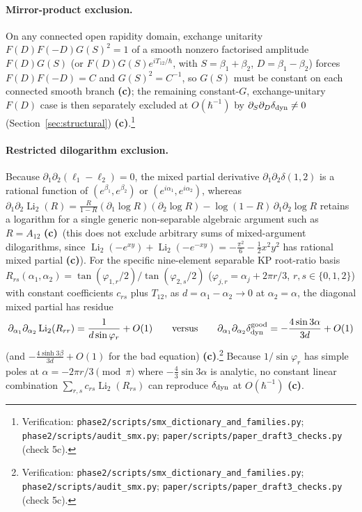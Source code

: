\documentclass[11pt,a4paper]{article}
\newcommand{\lab}[1]{{\normalfont\sffamily\footnotesize\bfseries(#1)}}
\newcommand{\Lc}{\lab{c}}
\newcommand{\scr}[1]{\nolinkurl{#1}}
\newcommand{\chk}[1]{\footnote{\raggedright Verification: #1.}}
\newcommand{\hb}{\hbar}
\theoremstyle{remark}
\begin{document}
\paragraph{Mirror-product exclusion.} On any connected open rapidity domain, exchange unitarity $F(D)F(-D)G(S)^2=1$ of a smooth nonzero factorised amplitude $F(D)G(S)$ (or $F(D)G(S)e^{iT_{12}/\hb}$, with $S=\beta_1+\beta_2$, $D=\beta_1-\beta_2$) forces $F(D)F(-D)=C$ and $G(S)^2=C^{-1}$, so $G(S)$ must be constant on each connected smooth branch \Lc; the remaining constant-$G$, exchange-unitary $F(D)$ case is then separately excluded at $O(\hb^{-1})$ by $\partial_S\partial_D\delta_{\rm dyn}\neq0$ (Section~\ref{sec:structural}) \Lc.\chk{\scr{phase2/scripts/smx_dictionary_and_families.py}; \scr{phase2/scripts/audit_smx.py}; \scr{paper/scripts/paper_draft3_checks.py} (check 5c)}

\paragraph{Restricted dilogarithm exclusion.} Because $\partial_1\partial_2(\ell_1-\ell_2)=0$, the mixed partial derivative $\partial_1\partial_2\delta(1,2)$ is a rational function of $(e^{\beta_1},e^{\beta_2})$ or $(e^{i\alpha_1},e^{i\alpha_2})$, whereas $\partial_1\partial_2\operatorname{Li}_2(R)=\frac{R}{1-R}(\partial_1\log R)(\partial_2\log R)-\log(1-R)\,\partial_1\partial_2\log R$ retains a logarithm for a single generic non-separable algebraic argument such as $R=A_{12}$ \Lc\ (this does not exclude arbitrary sums of mixed-argument dilogarithms, since $\operatorname{Li}_2(-e^{xy})+\operatorname{Li}_2(-e^{-xy})=-\frac{\pi^2}6-\tfrac12x^2y^2$ has rational mixed partial \Lc). For the specific nine-element separable KP root-ratio basis $R_{rs}(\alpha_1,\alpha_2)=\tan(\varphi_{1,r}/2)/\tan(\varphi_{2,s}/2)$ ($\varphi_{j,r}=\alpha_j+2\pi r/3$, $r,s\in\{0,1,2\}$) with constant coefficients $c_{rs}$ plus $T_{12}$, as $d=\alpha_1-\alpha_2\to0$ at $\alpha_2=\alpha$, the diagonal mixed partial has residue
\begin{equation}\label{eq:dilogres}
\partial_{\alpha_1}\partial_{\alpha_2}\operatorname{Li}_2(R_{rr})=\frac1{d\sin\varphi_r}+O(1)\qquad\text{versus}\qquad
\partial_{\alpha_1}\partial_{\alpha_2}\delta_{\rm dyn}^{\rm good}=-\frac{4\sin3\alpha}{3d}+O(1)
\end{equation}
(and $-\frac{4\sinh3\beta}{3d}+O(1)$ for the bad equation) \Lc.\chk{\scr{phase2/scripts/smx_dictionary_and_families.py}; \scr{phase2/scripts/audit_smx.py}; \scr{paper/scripts/paper_draft3_checks.py} (check 5c)}
Because $1/\sin\varphi_r$ has simple poles at $\alpha=-2\pi r/3\pmod\pi$ where $-\tfrac43\sin3\alpha$ is analytic, no constant linear combination $\sum_{r,s}c_{rs}\operatorname{Li}_2(R_{rs})$ can reproduce $\delta_{\rm dyn}$ at $O(\hb^{-1})$ \Lc.
\end{document}
